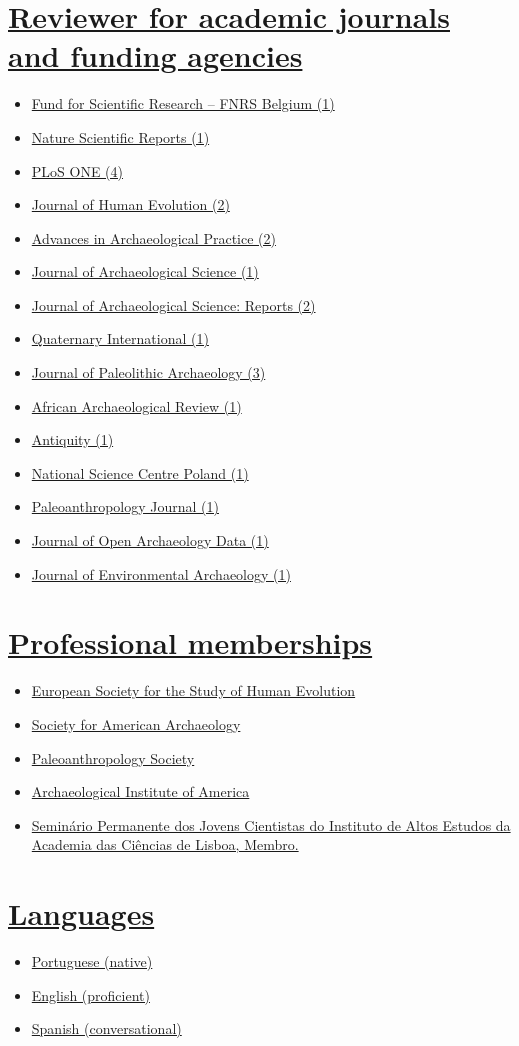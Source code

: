 \documentclass[11pt,a4paper,]{awesome-cv}
\providecommand{\tightlist}{%
	\setlength{\itemsep}{0pt}\setlength{\parskip}{0pt}}
\begin{document}
\section{\texorpdfstring{\ul{Reviewer for academic journals and funding
agencies}}{Reviewer for academic journals and funding agencies}}\label{reviewer-for-academic-journals-and-funding-agencies}

\begin{itemize}
\tightlist
\item
  \ul{Fund for Scientific Research -- FNRS Belgium (1)}
\item
  \ul{Nature Scientific Reports (1)}
\item
  \ul{PLoS ONE (4)}
\item
  \ul{Journal of Human Evolution (2)}
\item
  \ul{Advances in Archaeological Practice (2)}
\item
  \ul{Journal of Archaeological Science (1)}
\item
  \ul{Journal of Archaeological Science: Reports (2)}
\item
  \ul{Quaternary International (1)}
\item
  \ul{Journal of Paleolithic Archaeology (3)}
\item
  \ul{African Archaeological Review (1)}
\item
  \ul{Antiquity (1)}
\item
  \ul{National Science Centre Poland (1)}
\item
  \ul{Paleoanthropology Journal (1)}
\item
  \ul{Journal of Open Archaeology Data (1)}
\item
  \ul{Journal of Environmental Archaeology (1)}
\end{itemize}

\section{\texorpdfstring{\ul{Professional
memberships}}{Professional memberships}}\label{professional-memberships}

\begin{itemize}
\tightlist
\item
  \ul{European Society for the Study of Human Evolution}
\item
  \ul{Society for American Archaeology}
\item
  \ul{Paleoanthropology Society}
\item
  \ul{Archaeological Institute of America}
\item
  \ul{Seminário Permanente dos Jovens Cientistas do Instituto de Altos
  Estudos da Academia das Ciências de Lisboa, Membro.}
\end{itemize}

\section{\texorpdfstring{\ul{Languages}}{Languages}}\label{languages}

\begin{itemize}
\tightlist
\item
  \ul{Portuguese (native)}
\item
  \ul{English (proficient)}
\item
  \ul{Spanish (conversational)}
\end{itemize}
\end{document}

